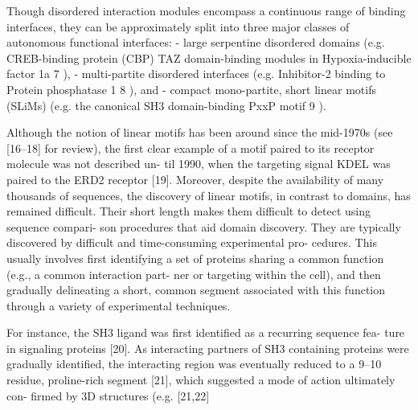 Though disordered interaction modules encompass a continuous range of binding interfaces, they can be approximately split into
three major classes of autonomous functional interfaces: 
- large serpentine disordered domains (e.g. CREB-binding protein (CBP) TAZ domain-binding modules in Hypoxia-inducible factor 1a 7 ), 
- multi-partite disordered interfaces (e.g. Inhibitor-2 binding to Protein phosphatase 1 8 ), and 
- compact mono-partite, short linear motifs (SLiMs) (e.g. the canonical SH3 domain-binding PxxP motif 9 ).























Although the notion of linear motifs has been around since
the mid-1970s (see [16–18] for review), the first clear example
of a motif paired to its receptor molecule was not described un-
til 1990, when the targeting signal KDEL was paired to the
ERD2 receptor [19].
Moreover, despite the availability of
many thousands of sequences, the discovery of linear motifs,
in contrast to domains, has remained difficult. Their short
length makes them difficult to detect using sequence compari-
son procedures that aid domain discovery. They are typically
discovered by difficult and time-consuming experimental pro-
cedures. This usually involves first identifying a set of proteins
sharing a common function (e.g., a common interaction part-
ner or targeting within the cell), and then gradually delineating
a short, common segment associated with this function
through a variety of experimental techniques.

For instance,
the SH3 ligand was first identified as a recurring sequence fea-
ture in signaling proteins [20]. As interacting partners of SH3
containing proteins were gradually identified, the interacting
region was eventually reduced to a 9–10 residue, proline-rich
segment [21], which suggested a mode of action ultimately con-
firmed by 3D structures (e.g. [21,22]


